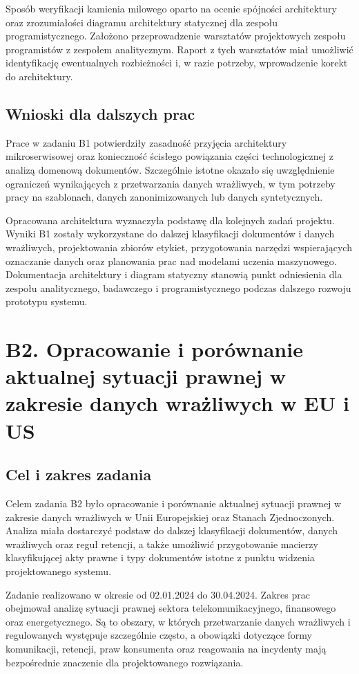 \documentclass[12pt,a4paper]{report}
\begin{document}
Sposób weryfikacji kamienia milowego oparto na ocenie spójności architektury oraz zrozumiałości diagramu architektury statycznej dla zespołu programistycznego. Założono przeprowadzenie warsztatów projektowych zespołu programistów z zespołem analitycznym. Raport z tych warsztatów miał umożliwić identyfikację ewentualnych rozbieżności i, w razie potrzeby, wprowadzenie korekt do architektury.

\subsection{Wnioski dla dalszych prac}
Prace w zadaniu B1 potwierdziły zasadność przyjęcia architektury mikroserwisowej oraz konieczność ścisłego powiązania części technologicznej z analizą domenową dokumentów. Szczególnie istotne okazało się uwzględnienie ograniczeń wynikających z przetwarzania danych wrażliwych, w tym potrzeby pracy na szablonach, danych zanonimizowanych lub danych syntetycznych.

Opracowana architektura wyznaczyła podstawę dla kolejnych zadań projektu. Wyniki B1 zostały wykorzystane do dalszej klasyfikacji dokumentów i danych wrażliwych, projektowania zbiorów etykiet, przygotowania narzędzi wspierających oznaczanie danych oraz planowania prac nad modelami uczenia maszynowego. Dokumentacja architektury i diagram statyczny stanowią punkt odniesienia dla zespołu analitycznego, badawczego i programistycznego podczas dalszego rozwoju prototypu systemu.



\section{B2. Opracowanie i porównanie aktualnej sytuacji prawnej w zakresie danych wrażliwych w EU i US}
\subsection{Cel i zakres zadania}
Celem zadania B2 było opracowanie i porównanie aktualnej sytuacji prawnej w zakresie danych wrażliwych w Unii Europejskiej oraz Stanach Zjednoczonych. Analiza miała dostarczyć podstaw do dalszej klasyfikacji dokumentów, danych wrażliwych oraz reguł retencji, a także umożliwić przygotowanie macierzy klasyfikującej akty prawne i typy dokumentów istotne z punktu widzenia projektowanego systemu.

Zadanie realizowano w okresie od 02.01.2024 do 30.04.2024. Zakres prac obejmował analizę sytuacji prawnej sektora telekomunikacyjnego, finansowego oraz energetycznego. Są to obszary, w których przetwarzanie danych wrażliwych i regulowanych występuje szczególnie często, a obowiązki dotyczące formy komunikacji, retencji, praw konsumenta oraz reagowania na incydenty mają bezpośrednie znaczenie dla projektowanego rozwiązania.
\end{document}
